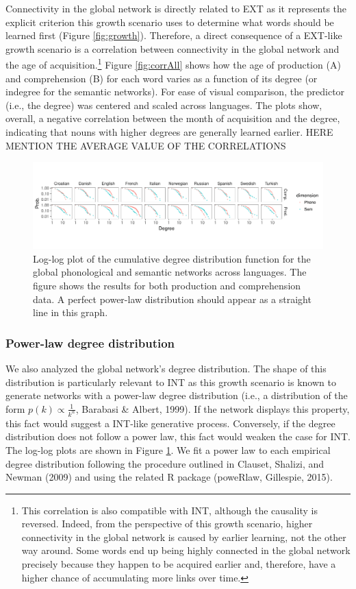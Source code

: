\documentclass[english,floatsintext,man]{apa6}
\theoremstyle{definition}
\theoremstyle{definition}
\theoremstyle{definition}
\theoremstyle{remark}
\begin{document}
Connectivity in the global network is directly related to EXT as it
represents the explicit criterion this growth scenario uses to determine
what words should be learned first (Figure \ref{fig:growth}). Therefore,
a direct consequence of a EXT-like growth scenario is a correlation
between connectivity in the global network and the age of
acquisition.\footnote{This correlation is also compatible with INT, although the causality is reversed. Indeed, from the perspective of this growth scenario, higher connectivity in the global network is caused by earlier learning, not the other way around. Some words end up being highly connected in the global network precisely because they happen to be acquired earlier and, therefore, have a higher chance of accumulating more links over time.}
Figure \ref{fig:corrAll} shows how the age of production (A) and
comprehension (B) for each word varies as a function of its degree (or
indegree for the semantic networks). For ease of visual comparison, the
predictor (i.e., the degree) was centered and scaled across languages.
The plots show, overall, a negative correlation between the month of
acquisition and the degree, indicating that nouns with higher degrees
are generally learned earlier. HERE MENTION THE AVERAGE VALUE OF THE
CORRELATIONS

\begin{figure}[!h]
\includegraphics[width=\textwidth]{figs/plot_degree} \caption{Log-log plot of the cumulative degree distribution function for the global phonological and semantic networks across languages. The figure shows the results for both production and comprehension data. A perfect power-law distribution should appear as a straight line in this graph.}\label{fig:degreeDist}
\end{figure}

\subsubsection{Power-law degree
distribution}\label{power-law-degree-distribution}

We also analyzed the global network's degree distribution. The shape of
this distribution is particularly relevant to INT as this growth
scenario is known to generate networks with a power-law degree
distribution (i.e., a distribution of the form
\(p(k) \propto \frac{1}{k^{\alpha}}\), Barabasi \& Albert, 1999). If the
network displays this property, this fact would suggest a INT-like
generative process. Conversely, if the degree distribution does not
follow a power law, this fact would weaken the case for INT. The log-log
plots are shown in Figure \ref{fig:degreeDist}. We fit a power law to
each empirical degree distribution following the procedure outlined in
Clauset, Shalizi, and Newman (2009) and using the related R package
(poweRlaw, Gillespie, 2015).
\end{document}
